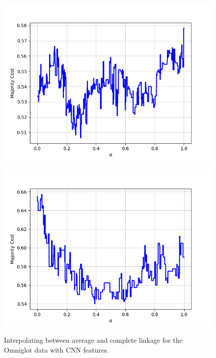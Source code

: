 \begin{figure}[H]
\begin{minipage}{.24\textwidth}
  {\includegraphics[width=\linewidth]{plots/omniglot-intra-ac-cnn/Tagalog}}
\end{minipage}
\begin{minipage}{.24\textwidth}
  \centering
  {\includegraphics[width=\linewidth]{plots/omniglot-intra-ac-cnn/Tifinagh}}
\end{minipage}
\caption{%
  Interpolating between average and complete linkage for the Omniglot data with CNN features.}
\label{}
\end{figure}

